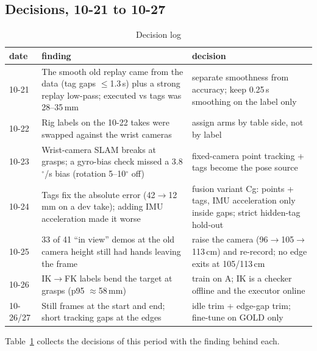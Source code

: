 \documentclass[conference,10pt]{IEEEtran}
\newcommand{\mm}{\,mm\xspace}
\begin{document}
\subsection{Decisions, 10-21 to 10-27}\label{sec:decisions}
\begin{table}[t]
\caption{Decision log}\label{tab:decisions}
\centering\small
\begin{tabular}{@{}p{}p{}p{}@{}}
\toprule
date & finding & decision \\
\midrule
10-21 & The smooth old replay came from the data (tag gaps $\le$1.3\,s) plus a strong replay low-pass; executed vs tags was
28--35\mm & separate smoothness from accuracy; keep 0.25\,s smoothing on the label only \\
10-22 & Rig labels on the 10-22 takes were swapped against the wrist cameras & assign arms by table side, not by label \\
10-23 & Wrist-camera SLAM breaks at grasps; a gyro-bias check missed a 3.8$^\circ$/s bias (rotation 5--10$^\circ$ off) &
fixed-camera point tracking + tags become the pose source \\
10-24 & Tags fix the absolute error (42$\to$12\mm on a dev take); adding IMU acceleration made it worse & fusion variant
Cg: points + tags, IMU acceleration only inside gaps; strict hidden-tag hold-out \\
10-25 & 33 of 41 ``in view'' demos at the old camera height still had hands leaving the frame & raise the camera
(96$\to$105$\to$113\,cm) and re-record; no edge exits at 105/113\,cm \\
10-26 & IK$\to$FK labels bend the target at grasps (p95 $\approx$58\mm) & train on A; IK is a checker offline and the
executor online \\
10-26/27 & Still frames at the start and end; short tracking gaps at the edges & idle trim + edge-gap trim; fine-tune on
GOLD only \\
\bottomrule
\end{tabular}
\end{table}
Table~\ref{tab:decisions} collects the decisions of this period with the finding behind each.
\end{document}
